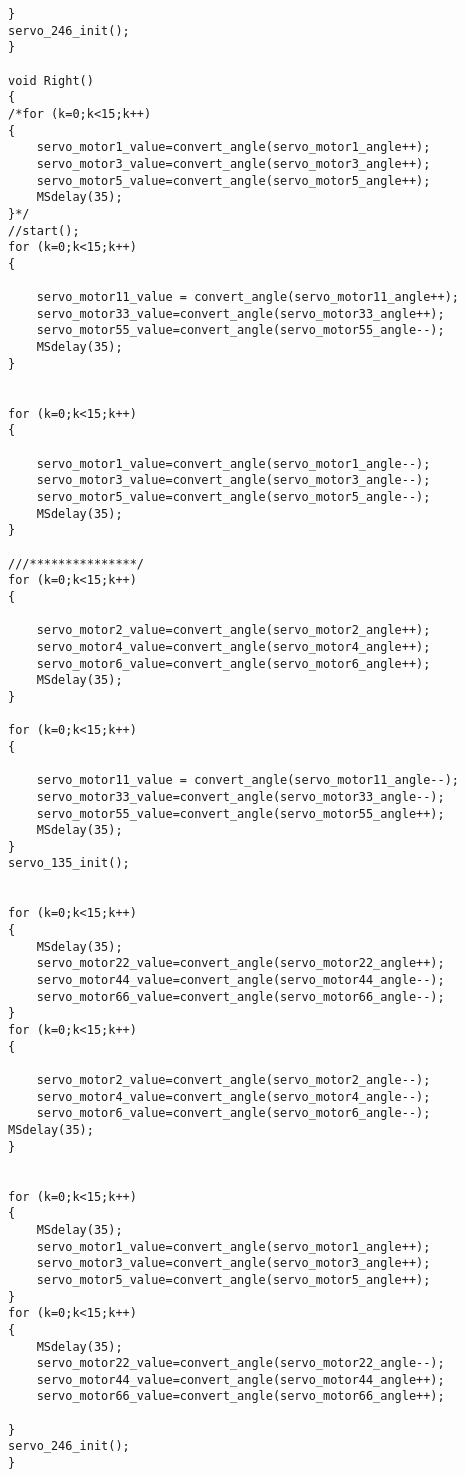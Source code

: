 \documentclass{report}
\begin{document}
\begin{appendices}
\begin{lstlisting}
}
servo_246_init();
}

void Right()
{
/*for (k=0;k<15;k++)
{
	servo_motor1_value=convert_angle(servo_motor1_angle++);
	servo_motor3_value=convert_angle(servo_motor3_angle++);        
	servo_motor5_value=convert_angle(servo_motor5_angle++);
	MSdelay(35);
}*/ 
//start();
for (k=0;k<15;k++)
{
	
	servo_motor11_value = convert_angle(servo_motor11_angle++);
	servo_motor33_value=convert_angle(servo_motor33_angle++);
	servo_motor55_value=convert_angle(servo_motor55_angle--);
	MSdelay(35);
}


for (k=0;k<15;k++)
{
	
	servo_motor1_value=convert_angle(servo_motor1_angle--);
	servo_motor3_value=convert_angle(servo_motor3_angle--);
	servo_motor5_value=convert_angle(servo_motor5_angle--);
	MSdelay(35);
}

///***************/
for (k=0;k<15;k++)
{

	servo_motor2_value=convert_angle(servo_motor2_angle++);
	servo_motor4_value=convert_angle(servo_motor4_angle++);
	servo_motor6_value=convert_angle(servo_motor6_angle++);	
	MSdelay(35);
}

for (k=0;k<15;k++)
{
	
	servo_motor11_value = convert_angle(servo_motor11_angle--);
	servo_motor33_value=convert_angle(servo_motor33_angle--);
	servo_motor55_value=convert_angle(servo_motor55_angle++);
	MSdelay(35);
}
servo_135_init();


for (k=0;k<15;k++)
{
	MSdelay(35);	
	servo_motor22_value=convert_angle(servo_motor22_angle++);
	servo_motor44_value=convert_angle(servo_motor44_angle--);
	servo_motor66_value=convert_angle(servo_motor66_angle--);
}
for (k=0;k<15;k++)
{
	
	servo_motor2_value=convert_angle(servo_motor2_angle--);
	servo_motor4_value=convert_angle(servo_motor4_angle--);
	servo_motor6_value=convert_angle(servo_motor6_angle--);	
MSdelay(35);
}


for (k=0;k<15;k++)
{
	MSdelay(35);
	servo_motor1_value=convert_angle(servo_motor1_angle++);
	servo_motor3_value=convert_angle(servo_motor3_angle++);
	servo_motor5_value=convert_angle(servo_motor5_angle++);
}
for (k=0;k<15;k++)
{
	MSdelay(35);
	servo_motor22_value=convert_angle(servo_motor22_angle--);
	servo_motor44_value=convert_angle(servo_motor44_angle++);
	servo_motor66_value=convert_angle(servo_motor66_angle++);
	
}
servo_246_init();
}




\end{lstlisting}
\end{appendices}
\end{document}

